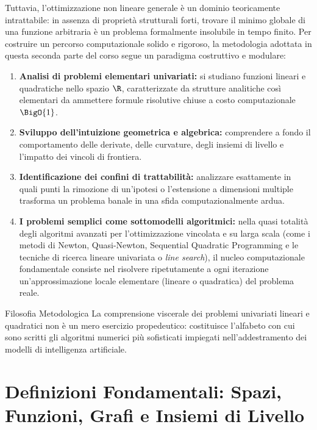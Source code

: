 Tuttavia, l'ottimizzazione non lineare generale \`e un dominio teoricamente intrattabile: in assenza di propriet\`a strutturali forti, trovare il minimo globale di una funzione arbitraria \`e un problema formalmente insolubile in tempo finito. Per costruire un percorso computazionale solido e rigoroso, la metodologia adottata in questa seconda parte del corso segue un paradigma costruttivo e modulare:
\begin{enumerate}
    \item \textbf{Analisi di problemi elementari univariati:} si studiano funzioni lineari e quadratiche nello spazio $\R$, caratterizzate da strutture analitiche cos\`i elementari da ammettere formule risolutive chiuse a costo computazionale $\BigO{1}$.
    \item \textbf{Sviluppo dell'intuizione geometrica e algebrica:} comprendere a fondo il comportamento delle derivate, delle curvature, degli insiemi di livello e l'impatto dei vincoli di frontiera.
    \item \textbf{Identificazione dei confini di trattabilit\`a:} analizzare esattamente in quali punti la rimozione di un'ipotesi o l'estensione a dimensioni multiple trasforma un problema banale in una sfida computazionalmente ardua.
    \item \textbf{I problemi semplici come sottomodelli algoritmici:} nella quasi totalit\`a degli algoritmi avanzati per l'ottimizzazione vincolata e su larga scala (come i metodi di Newton, Quasi-Newton, Sequential Quadratic Programming e le tecniche di ricerca lineare univariata o \textit{line search}), il nucleo computazionale fondamentale consiste nel risolvere ripetutamente a ogni iterazione un'approssimazione locale elementare (lineare o quadratica) del problema reale.
\end{enumerate}

\begin{noteblock}{Filosofia Metodologica}
La comprensione viscerale dei problemi univariati lineari e quadratici non \`e un mero esercizio propedeutico: costituisce l'alfabeto con cui sono scritti gli algoritmi numerici pi\`u sofisticati impiegati nell'addestramento dei modelli di intelligenza artificiale.
\end{noteblock}


\FloatBarrier
\section{Definizioni Fondamentali: Spazi, Funzioni, Grafi e Insiemi di Livello}
\label{sec:opt-definizioni-fondamentali}

